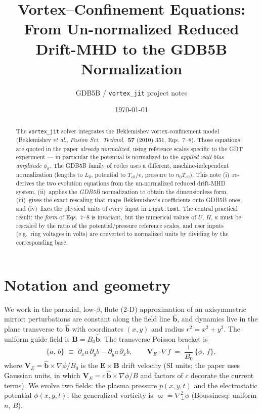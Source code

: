 \documentclass[11pt]{article}
\title{\textbf{Vortex--Confinement Equations:\\
From Un-normalized Reduced Drift-MHD to the GDB5B Normalization}}
\author{GDB5B / \texttt{vortex\_jit} project notes}
\date{\today}
\newcommand{\pb}[2]{\{#1,\,#2\}}
\newcommand{\vE}{\bm{V}_E}
\newcommand{\bhat}{\hat{\bm{b}}}
\newcommand{\gradperp}{\nabla_{\!\perp}}
\begin{document}
\maketitle

\begin{abstract}
The \texttt{vortex\_jit} solver integrates the Beklemishev vortex-confinement
model (Beklemishev \emph{et al.}, \emph{Fusion Sci.\ Technol.}\ \textbf{57} (2010)
351, Eqs.~7--8). Those equations are quoted in the paper \emph{already
normalized}, using reference scales specific to the GDT experiment --- in
particular the potential is normalized to the \emph{applied wall-bias amplitude}
$\phi_0$. The GDB5B family of codes uses a different, machine-independent
normalization (lengths to $L_0$, potential to $T_{e0}/e$, pressure to
$n_0 T_{e0}$). This note (i)~re-derives the two evolution equations from the
un-normalized reduced drift-MHD system, (ii)~applies the \emph{GDB5B}
normalization to obtain the dimensionless form, (iii)~gives the exact rescaling
that maps Beklemishev's coefficients onto GDB5B ones, and (iv)~fixes the physical
units of every input in \texttt{input.toml}. The central practical result: the
\emph{form} of Eqs.~7--8 is invariant, but the numerical values of
$U,\,H,\,\kappa$ must be rescaled by the ratio of the potential/pressure
reference scales, and user inputs (e.g.\ ring voltages in volts) are converted to
normalized units by dividing by the corresponding base.
\end{abstract}

\section{Notation and geometry}
We work in the paraxial, low-$\beta$, flute (2-D) approximation of an axisymmetric
mirror: perturbations are constant along the field line $\bhat$, and dynamics
live in the plane transverse to $\bhat$ with coordinates $(x,y)$ and radius
$r^2=x^2+y^2$. The uniform guide field is $\bm{B}=B_0\bhat$. The transverse
Poisson bracket is
\begin{equation}
  \pb{a}{b} \;\equiv\; \partial_x a\,\partial_y b - \partial_y a\,\partial_x b,
  \qquad
  \vE\cdot\nabla f \;=\; \frac{1}{B_0}\,\pb{\phi}{f},
  \label{eq:bracket}
\end{equation}
where $\vE=\bhat\times\nabla\phi/B_0$ is the $\bm{E}\times\bm{B}$ drift velocity
(SI units; the paper uses Gaussian units, in which $\vE=c\,\bhat\times\nabla\phi/B$
and factors of $c$ decorate the current terms). We evolve two fields: the plasma
pressure $p(x,y,t)$ and the electrostatic potential $\phi(x,y,t)$; the
generalized vorticity is $\varpi=\gradperp^2\phi$ (Boussinesq: uniform $n$, $B$).
\end{document}
